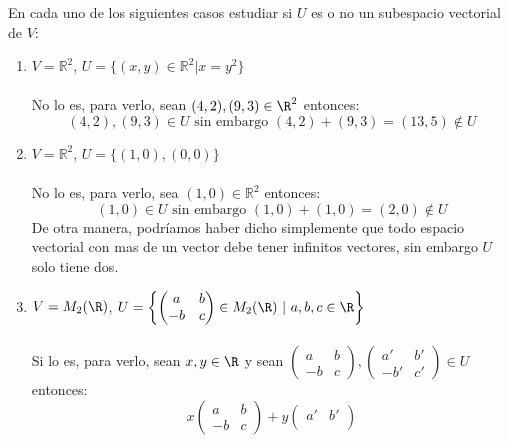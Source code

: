 \begin{ejercicio}En cada uno de los siguientes casos estudiar si $U$ es o no un subespacio vectorial de $V$:
	\begin{enumerate}
		\item $V = \mathbb{R}^2$, $U = \{ (x,y) \in \mathbb{R}^2 | x = y^2 \}$
		      \\ \\ No lo es, para verlo, sean $(4,2), (9,3) \in \R^2$ entonces:
		      \begin{equation*}
			      (4,2), (9,3) \in U \text{ sin embargo } (4,2)+(9,3)=(13,5) \notin U
		      \end{equation*}
		\item $V = \mathbb{R}^2$, $U = \{ (1,0), (0,0) \}$ \\ \\ No lo es, para verlo, sea $(1,0) \in \mathbb{R}^2$ entonces:
		      \begin{equation*}
			      (1,0) \in U \text{ sin embargo } (1,0)+(1,0)=(2,0) \notin U
		      \end{equation*}
		      De otra manera, podríamos haber dicho simplemente que todo espacio vectorial con mas de un vector debe
		      tener infinitos vectores, sin embargo $U$ solo tiene dos.
		\item $V = M_2 (\R) $, $U = \left\{
			      \begin{pmatrix}
				      a  & b \\
				      -b & c
			      \end{pmatrix}
			      \in M_2 (\R) \ | \ a,b,c \in \R \right\}$ \\ \\ Si lo es, para verlo, sean $x,y \in \R $ y sean $\begin{pmatrix}
				      a  & b \\
				      -b & c
			      \end{pmatrix},
			      \begin{pmatrix}
				      a'  & b' \\
				      -b' & c'
			      \end{pmatrix} \in U$ entonces:
		      \begin{equation*}
			      x \begin{pmatrix}
				      a  & b \\
				      -b & c
			      \end{pmatrix} + y \begin{pmatrix}
				      a'  & b' \\

\end{pmatrix}
\end{equation*}
\end{enumerate}
\end{ejercicio}
